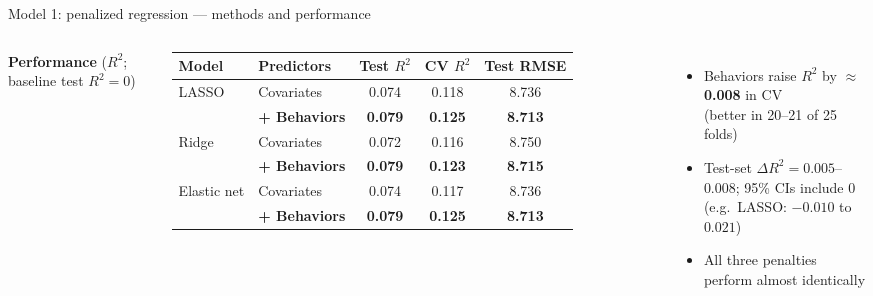 \documentclass[aspectratio=169,10pt]{beamer}
\newcommand{\muted}[1]{{\color{muted}#1}}
\begin{document}
\begin{frame}{Model 1: penalized regression --- methods and performance}
\begin{columns}[T,onlytextwidth]
\small\textbf{Performance} \muted{\footnotesize ($R^2$; baseline test $R^2 = 0$)}\par\vspace{4pt}
{\footnotesize
\setlength\tabcolsep{4pt}\begin{tabular}{@{}llccc@{}}
\toprule
Model & Predictors & Test $R^2$ & CV $R^2$ & Test RMSE \\
\midrule
LASSO       & Covariates   & 0.074 & 0.118 & 8.736 \\
            & \textbf{+ Behaviors}  & \textbf{0.079} & \textbf{0.125} & \textbf{8.713} \\[2pt]
Ridge       & Covariates   & 0.072 & 0.116 & 8.750 \\
            & \textbf{+ Behaviors}  & \textbf{0.079} & \textbf{0.123} & \textbf{8.715} \\[2pt]
Elastic net & Covariates   & 0.074 & 0.117 & 8.736 \\
            & \textbf{+ Behaviors}  & \textbf{0.079} & \textbf{0.125} & \textbf{8.713} \\
\bottomrule
\end{tabular}}
\par\vspace{6pt}
{\footnotesize
\begin{itemize}\setlength\itemsep{1pt}\setlength\parskip{0pt}
  \item Behaviors raise $R^2$ by $\approx$\,\textbf{0.008} in CV \\
        \muted{(better in 20--21 of 25 folds)}
  \item Test-set $\Delta R^2 = 0.005$--$0.008$; 95\% CIs include 0 \\
        \muted{(e.g.\ LASSO: $-0.010$ to $0.021$)}
  \item All three penalties perform almost identically
\end{itemize}}
\end{columns}
\end{frame}
\end{document}
